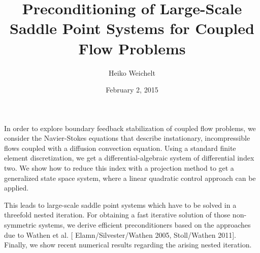 \documentclass{article}
\title{Preconditioning of Large-Scale Saddle Point Systems
  for Coupled Flow Problems}
\author{Heiko Weichelt}
\affil{PhD student at Max Planck Institute for Dynamics of Complex
    Technical Systems Magdeburg, Germany}
\date{February 2, 2015}
\begin{document}
\maketitle
In order to explore boundary feedback stabilization of coupled flow
problems, we consider the Navier-Stokes equations that describe
instationary, incompressible flows coupled with a diffusion convection
equation. Using a standard finite element discretization, we get a
differential-algebraic system of differential index two. We show how
to reduce this index with a projection method to get a generalized
state space system, where a linear quadratic control approach can be
applied.

This leads to large-scale saddle point systems which have to be solved
in a threefold nested iteration. For obtaining a fast iterative
solution of those non-symmetric systems, we derive efficient
preconditioners based on the approaches due to Wathen et al. [{\sc
  Elamn/Silvester/Wathen 2005, Stoll/Wathen 2011}]. Finally, we show
recent numerical results regarding the arising nested iteration.
\end{document}
